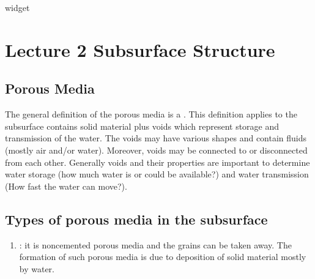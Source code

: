\documentclass[letterpaper,10pt,english]{sphinxmanual}
\let\sphinxpxdimen\pdfpxdimen\else\newdimen\sphinxpxdimen
\begin{document}
\begin{sphinxVerbatim}[commandchars=\\\{\}]
   
   
 widget
  
\end{sphinxVerbatim}


\section{Lecture 2 \sphinxhyphen{} Subsurface Structure}
\label{\detokenize{contents/flow/lecture_02/12_subsurface_structure:lecture-2-subsurface-structure}}\label{\detokenize{contents/flow/lecture_02/12_subsurface_structure::doc}}


\subsection{Porous Media}
\label{\detokenize{contents/flow/lecture_02/12_subsurface_structure:porous-media}}
The general definition of the porous media is a . This definition applies to the subsurface contains solid material plus voids which represent storage and transmission of the water. The voids may have various shapes and contain fluids (mostly air and/or water). Moreover, voids may be connected to or disconnected from each other.
Generally voids and their properties are important to determine water storage (how much water is or could be available?) and water transmission (How fast the water can move?).


\subsection{Types of porous media in the subsurface}
\label{\detokenize{contents/flow/lecture_02/12_subsurface_structure:types-of-porous-media-in-the-subsurface}}
\noindent\sphinxincludegraphics[width=300\sphinxpxdimen]{{L02_fig1}.png}
\begin{enumerate}
%
\item {} 
: it is non\sphinxhyphen{}cemented porous media and the grains can be taken away. The formation of such porous media is due to deposition of solid material mostly by water.

\end{enumerate}
\end{document}

